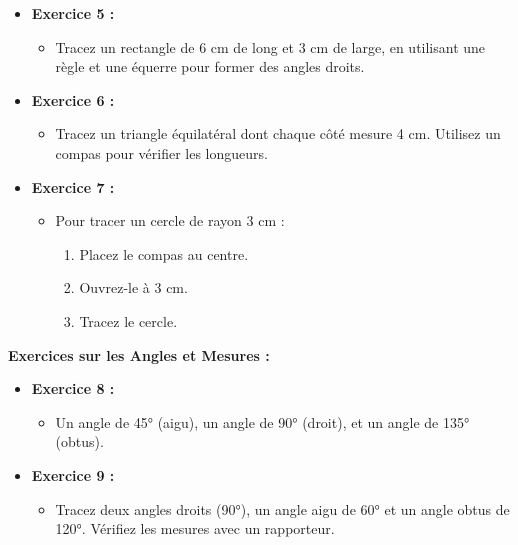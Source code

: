 \documentclass{article}
\begin{document}
\begin{tcolorbox}[colback=green!10!white, colframe=green!75!black, title=\textcolor{white}{Corrections }, sharp corners=south]
\begin{itemize}
        \item \textbf{Exercice 5 :} 
            \begin{itemize}
                \item Tracez un rectangle de 6 cm de long et 3 cm de large, en utilisant une règle et une équerre pour former des angles droits.
            \end{itemize}

        \item \textbf{Exercice 6 :} 
            \begin{itemize}
                \item Tracez un triangle équilatéral dont chaque côté mesure 4 cm. Utilisez un compas pour vérifier les longueurs.
            \end{itemize}

        \item \textbf{Exercice 7 :} 
            \begin{itemize}
                \item Pour tracer un cercle de rayon 3 cm : 
                    \begin{enumerate}
                        \item Placez le compas au centre.
                        \item Ouvrez-le à 3 cm.
                        \item Tracez le cercle.
                    \end{enumerate}
            \end{itemize}
    \end{itemize}

    \vspace{4pt}

    \textbf{Exercices sur les Angles et Mesures :}

    \begin{itemize}
        \item \textbf{Exercice 8 :} 
            \begin{itemize}
                \item Un angle de 45° (aigu), un angle de 90° (droit), et un angle de 135° (obtus).
            \end{itemize}

        \item \textbf{Exercice 9 :} 
            \begin{itemize}
                \item Tracez deux angles droits (90°), un angle aigu de 60° et un angle obtus de 120°. Vérifiez les mesures avec un rapporteur.
            \end{itemize}
    \end{itemize}


\end{tcolorbox}
\end{document}

